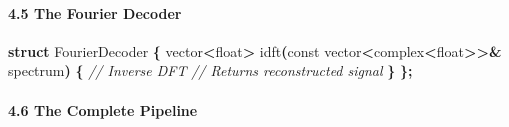 \documentclass[
  11pt,
  a4paper,
]{article}
\newenvironment{Shaded}{\begin{snugshade}}{\end{snugshade}}
\newcommand{\AttributeTok}[1]{\textcolor[rgb]{0.13,0.29,0.53}{#1}}
\newcommand{\CommentTok}[1]{\textcolor[rgb]{0.56,0.35,0.01}{\textit{#1}}}
\newcommand{\DataTypeTok}[1]{\textcolor[rgb]{0.13,0.29,0.53}{#1}}
\newcommand{\KeywordTok}[1]{\textcolor[rgb]{0.13,0.29,0.53}{\textbf{#1}}}
\newcommand{\NormalTok}[1]{#1}
\newcommand{\OperatorTok}[1]{\textcolor[rgb]{0.81,0.36,0.00}{\textbf{#1}}}
\begin{document}
\paragraph{4.5 The Fourier Decoder}\label{the-fourier-decoder}

\begin{Shaded}
\begin{Highlighting}[]
\KeywordTok{struct}\NormalTok{ FourierDecoder }\OperatorTok{\{}
\NormalTok{    vector}\OperatorTok{\textless{}}\DataTypeTok{float}\OperatorTok{\textgreater{}}\NormalTok{ idft}\OperatorTok{(}\AttributeTok{const}\NormalTok{ vector}\OperatorTok{\textless{}}\NormalTok{complex}\OperatorTok{\textless{}}\DataTypeTok{float}\OperatorTok{\textgreater{}\textgreater{}\&}\NormalTok{ spectrum}\OperatorTok{)} \OperatorTok{\{}
        \CommentTok{// Inverse DFT}
        \CommentTok{// Returns reconstructed signal}
    \OperatorTok{\}}
\OperatorTok{\};}
\end{Highlighting}
\end{Shaded}

\paragraph{4.6 The Complete Pipeline}\label{the-complete-pipeline}
\end{document}
